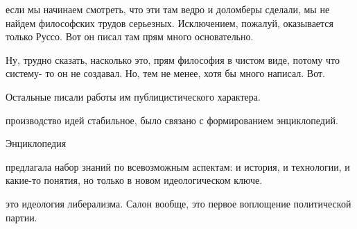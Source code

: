 

если мы начинаем смотреть, что эти там ведро и доломберы
сделали, мы не найдем философских трудов серьезных. Исключением, пожалуй,
оказывается только Руссо. Вот он писал там прям много основательно. 

Ну,
трудно сказать, насколько это, прям философия в чистом виде, потому что систему-
то он не создавал. Но, тем не менее, хотя бы много написал. Вот. 

Остальные
писали работы им публицистического
характера. 

производство
идей стабильное, было связано с формированием энциклопедий. 

Энциклопедия


предлагала набор знаний по всевозможным аспектам: 
и история, и технологии, и какие-то понятия, но только в новом
идеологическом ключе. 


это идеология либерализма. Салон
вообще, это первое воплощение политической партии. 




